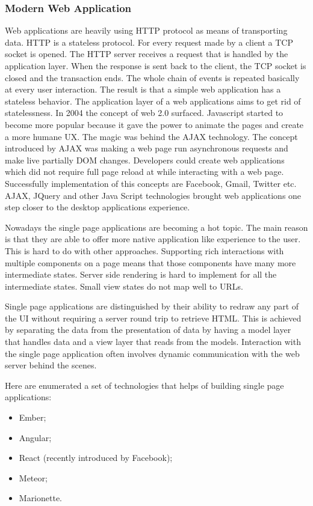 \subsubsection{Modern Web Application}
Web applications are heavily using HTTP protocol as means of transporting data. HTTP is a stateless protocol. For every request made by a client a TCP socket is opened. The HTTP server receives a request that is handled by the application layer. When the response is sent back to the client, the TCP socket is closed and the transaction ends. The whole chain of events is repeated basically at every user interaction. The result is that a simple web application has a stateless behavior. The application layer of a web applications aims to get rid of statelessness. In 2004 the concept of web 2.0 surfaced. Javascript started to become more popular because it gave the power to animate the pages and create a more humane UX. The magic was behind the AJAX technology. The concept introduced by AJAX was making a web page run asynchronous requests and make live partially DOM changes. Developers could create web applications which did not require full page reload at while interacting with a web page. Successfully implementation of this concepts are Facebook, Gmail, Twitter etc. AJAX, JQuery and other Java Script technologies brought web applications one step closer to the desktop applications experience.

Nowadays the single page applications are becoming a hot topic. The main reason is that they are able to offer more native application like experience to the user. This is hard to do with other approaches. Supporting rich interactions with multiple components on a page means that those components have many more intermediate states. Server side rendering is hard to implement for all the intermediate states. Small view states do not map well to URLs.

Single page applications are distinguished by their ability to redraw any part of the UI without requiring a server round trip to retrieve HTML. This is achieved by separating the data from the presentation of data by having a model layer that handles data and a view layer that reads from the models. Interaction with the single page application often involves dynamic communication with the web server behind the scenes.

Here are enumerated a set of technologies that helps of building single page applications:
\begin{itemize}
    \item Ember;
    \item Angular;
    \item React (recently introduced by Facebook\cite{react});
    \item Meteor;
    \item Marionette.
\end{itemize}

